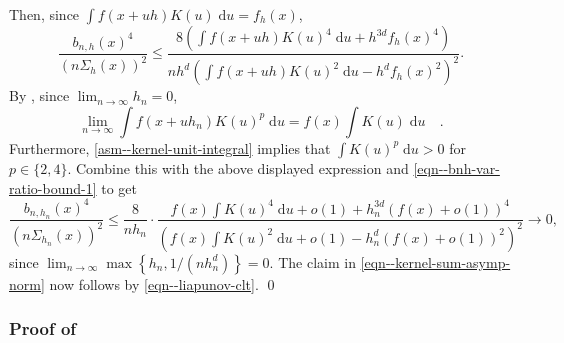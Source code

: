 Then, since \(\int f (x + u h) K (u) \; \mathrm{d} u = f_{h} (x)\),
\begin{equation}
  \frac{b_{n, h} (x)^{4}}{\left( n \Sigma_{h} (x) \right)^{2}} \leq \frac{8
  \left( \int f (x + u h) K (u)^{4} \; \mathrm{d} u + h^{3 d} f_{h} (x)^{4}
  \right)}{n h^{d} \left( \int f (x + u h) K (u)^{2} \; \mathrm{d} u - h^{d}
  f_{h} (x)^{2} \right)^{2}}.
  \label{eqn--bnh-var-ratio-bound-1}
\end{equation}
By , since \(\lim_{n \to \infty} h_{n} =
0\),
\begin{equation*}
  \lim_{n \to \infty} \int f \left( x + u h_{n} \right) K (u)^{p} \; \mathrm{d}
  u = f (x) \int K (u) \; \mathrm{d} u \quad.
\end{equation*}
Furthermore,  \ref{asm--kernel-unit-integral} implies that
\(\int K (u)^{p} \; \mathrm{d} u > 0\) for \(p \in \{2, 4\}\).
Combine this with the above displayed expression and
\eqref{eqn--bnh-var-ratio-bound-1} to get
\begin{equation*}
  \frac{b_{n, h_{n}} (x)^{4}}{\left( n \Sigma_{h_{n}} (x) \right)^{2}} \leq
  \frac{8}{n h_{n}} \cdot \frac{f (x) \int K (u)^{4} \; \mathrm{d} u + o (1) +
  h_{n}^{3 d} (f (x) + o (1))^{4}}{\left( f (x) \int K (u)^{2} \; \mathrm{d} u +
  o (1) - h_{n}^{d} (f (x) + o (1))^{2} \right)^{2}} \to 0,
\end{equation*}
since \(\lim_{n \to \infty} \max\left\{ h_{n}, 1 / \left( n h_{n}^{d} \right)
\right\} = 0\).
The claim in \eqref{eqn--kernel-sum-asymp-norm} now follows by
\eqref{eqn--liapunov-clt}.
\qed

\subsubsection{Proof of
\texorpdfstring{}{Theorem
\ref{thm--kde-asymp-norm-conv-var}}}
\label{sec--prf--thm--kde-asymp-norm-conv-var}

